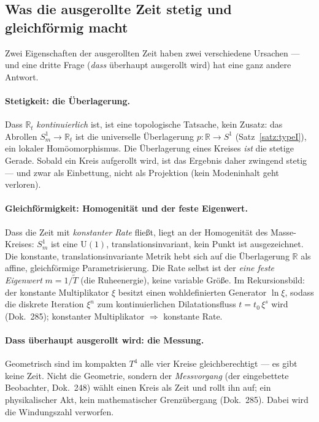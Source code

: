 \subsection{Was die ausgerollte Zeit stetig und gleichf\"ormig macht}

Zwei Eigenschaften der ausgerollten Zeit haben zwei verschiedene Ursachen --- und eine
dritte Frage (\emph{dass} \"uberhaupt ausgerollt wird) hat eine ganz andere Antwort.

\paragraph{Stetigkeit: die \"Uberlagerung.} Dass $\mathbb{R}_t$ \emph{kontinuierlich} ist,
ist eine topologische Tatsache, kein Zusatz: das Abrollen $S^1_m\to\mathbb{R}_t$ ist die
universelle \"Uberlagerung $p:\mathbb{R}\to S^1$ (Satz~\ref{satz:typeI}), ein lokaler
Hom\"oomorphismus. Die \"Uberlagerung eines Kreises \emph{ist} die stetige Gerade. Sobald
ein Kreis aufgerollt wird, ist das Ergebnis daher zwingend stetig --- und zwar als
Einbettung, nicht als Projektion (kein Modeninhalt geht verloren).

\paragraph{Gleichf\"ormigkeit: Homogenit\"at und der feste Eigenwert.} Dass die Zeit mit
\emph{konstanter Rate} flie\ss t, liegt an der Homogenit\"at des Masse-Kreises: $S^1_m$ ist
eine U$(1)$, translationsinvariant, kein Punkt ist ausgezeichnet. Die konstante,
translationsinvariante Metrik hebt sich auf die \"Uberlagerung $\mathbb{R}$ als affine,
gleichf\"ormige Parametrisierung. Die Rate selbst ist der \emph{eine feste Eigenwert}
$m=1/\tilde T$ (die Ruheenergie), keine variable Gr\"o\ss e. Im Rekursionsbild: der
konstante Multiplikator $\xi$ besitzt einen wohldefinierten Generator $\ln\xi$, sodass die
diskrete Iteration $\xi^n$ zum kontinuierlichen Dilatationsfluss $t=t_0\,\xi^s$ wird
(Dok.~285); konstanter Multiplikator $\Rightarrow$ konstante Rate.

\paragraph{Dass \"uberhaupt ausgerollt wird: die Messung.} Geometrisch sind im kompakten
$T^4$ alle vier Kreise gleichberechtigt --- es gibt keine Zeit. Nicht die Geometrie,
sondern der \emph{Messvorgang} (der eingebettete Beobachter, Dok.~248) w\"ahlt einen Kreis
als Zeit und rollt ihn auf; ein physikalischer Akt, kein mathematischer Grenz\"ubergang
(Dok.~285). Dabei wird die Windungszahl verworfen.


